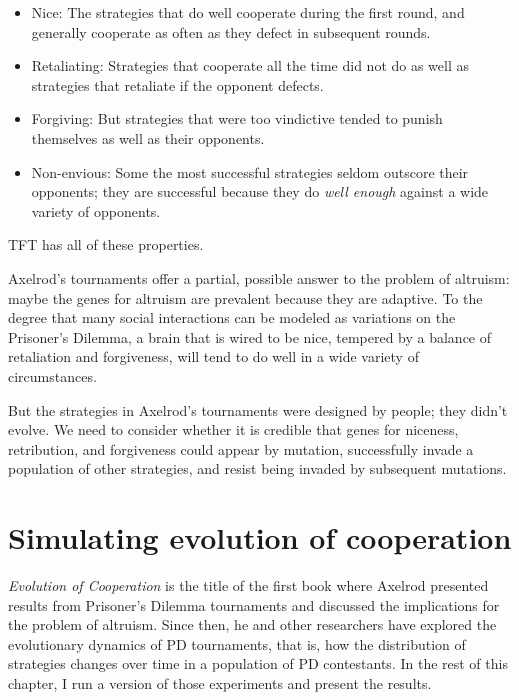 \documentclass[12pt]{book}
\theoremstyle{exercise}
\begin{document}
\begin{itemize}

\item Nice: The strategies that do well cooperate during the first round, and generally cooperate as often as they defect in subsequent rounds.

\item Retaliating: Strategies that cooperate all the time did not do as well as strategies that retaliate if the opponent defects.

\item Forgiving: But strategies that were too vindictive tended to punish themselves as well as their opponents.

\item Non-envious: Some the most successful strategies seldom outscore their opponents; they are successful because they do {\em well enough} against a wide variety of opponents.

\end{itemize}

TFT has all of these properties.

Axelrod's tournaments offer a partial, possible answer to the problem of altruism: maybe the genes for altruism are prevalent because they are adaptive.  To the degree that many social interactions can be modeled as variations on the Prisoner's Dilemma, a brain that is wired to be nice, tempered by a balance of retaliation and forgiveness, will tend to do well in a wide variety of circumstances.

But the strategies in Axelrod's tournaments were designed by people; they didn't evolve.  We need to consider whether it is credible that genes for niceness, retribution, and forgiveness could appear by mutation, successfully invade a population of other strategies, and resist being invaded by subsequent mutations.


\section{Simulating evolution of cooperation}

{\em Evolution of Cooperation} is the title of the first book where Axelrod presented results from Prisoner's Dilemma tournaments and discussed the implications for the problem of altruism.  Since then, he and other researchers have explored the evolutionary dynamics of PD tournaments, that is, how the distribution of strategies changes over time in a population of PD contestants.    In the rest of this chapter, I run a version of those experiments and present the results.
\end{document}
